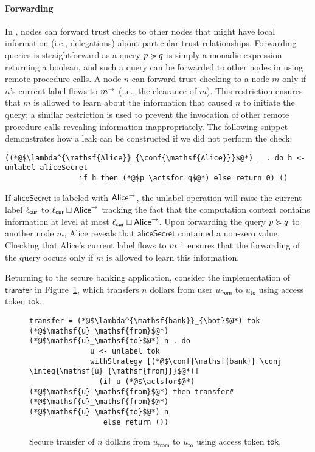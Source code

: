 \paragraph{Forwarding}
In \lang{}, nodes can forward trust checks to other nodes that might have local information (i.e., delegations) about particular trust relationships. Forwarding queries is straightforward as a query $p \succcurlyeq q$ is simply a monadic expression returning a boolean, and such a query can be forwarded to other nodes in \lang{} using remote procedure calls.
A node $n$ can forward trust checking to a node $m$ only if $n$'s current label flows to $m^{\rightarrow}$ (i.e., the clearance of $m$). This restriction ensures that $m$ is allowed to learn about the information that caused $n$ to initiate the query; a similar restriction is used to prevent the invocation of other remote procedure calls revealing information inappropriately.  The following snippet demonstrates how a leak can be constructed if we did not perform the check:
\begin{lstlisting}
((*@$\lambda^{\mathsf{Alice}}_{\conf{\mathsf{Alice}}}$@*) _ . do h <- unlabel aliceSecret
                 if h then (*@$p \actsfor q$@*) else return 0) ()
\end{lstlisting}
If $\mathsf{aliceSecret}$ is labeled with $\mathsf{Alice}^{\rightarrow}$, the unlabel operation will raise the current label $\ell_{\mathsf{cur}}$ to $\ell_{\mathsf{cur}} \sqcup \mathsf{Alice}^{\rightarrow}$ tracking the fact that the computation context contains information at level at most $\ell_{\mathsf{cur}} \sqcup \mathsf{Alice}^{\rightarrow}$. Upon forwarding the query $p \succcurlyeq q$ to another node $m$, Alice reveals that $\mathsf{aliceSecret}$ contained a non-zero value. Checking that Alice's current label flows to $m^{\rightarrow}$ ensures that the forwarding of the query occurs only if  $m$ is allowed to learn this information.

Returning to the secure banking application, consider the implementation of $\mathsf{transfer}$ in Figure~\ref{fig:sec-transfer}, which transfers $n$ dollars from user $u_\mathsf{from}$ to $u_\mathsf{to}$ using access token $\mathsf{tok}$.

\begin{figure}
\centering
\begin{lstlisting}
transfer = (*@$\lambda^{\mathsf{bank}}_{\bot}$@*) tok (*@$\mathsf{u}_\mathsf{from}$@*) (*@$\mathsf{u}_\mathsf{to}$@*) n . do
              u <- unlabel tok
              withStrategy [(*@$\conf{\mathsf{bank}} \conj \integ{\mathsf{u}_{\mathsf{from}}}$@*)]
                (if u (*@$\actsfor$@*) (*@$\mathsf{u}_\mathsf{from}$@*) then transfer# (*@$\mathsf{u}_\mathsf{from}$@*) (*@$\mathsf{u}_\mathsf{to}$@*) n
                 else return ())
\end{lstlisting}
\caption{Secure transfer of $n$ dollars from $u_{\mathsf{from}}$ to $u_{\mathsf{to}}$ using access token $\mathsf{tok}$.}
\label{fig:sec-transfer}
\end{figure}

